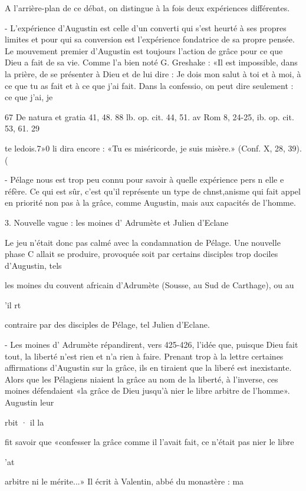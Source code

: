 A l'arrière-plan de ce débat, on distingue à la fois deux  expériences différentes.

-	L'expérience d'Augustin est celle d'un converti qui s'est heurté à ses propres limites et pour qui sa conversion est l'expérience fondatrice de sa propre pensée. Le mouvement premier d'Augustin est toujours l'action de grâce pour ce que Dieu a fait de sa vie. Comme l'a bien noté G. Greshake : «Il est impossible, dans la prière, de se présenter à Dieu et de lui dire : Je dois mon salut à toi et à moi, à ce que tu as fait et à ce que j'ai fait. Dans la confessio, on peut dire seulement : ce que j'ai, je



67  De natura et gratia 41, 48.
88 lb. op. cit. 44, 51.
av Rom 8, 24-25, ib. op. cit. 53, 61.
29
 
te ledois.7»0	li dira encore : «Tu es miséricorde, je suis misère.» (Conf. X, 28, 39).	(

-  Pélage nous est  trop peu  connu pour savoir à quelle expérience pers n elle    e réfère. Ce qui est sûr, c'est qu'il représente un type de chnst,anisme qui fait appel en priorité non pas à la grâce, comme Augustin, mais aux capacités de l'homme.

3.	Nouvelle vague : les moines d' Adrumète et Julien d'Eclane

Le jeu n'était donc pas calmé avec la condamnation de Pélage. Une nouvelle phase	C
allait se produire,	provoquée soit par certains disciples trop dociles d'Augustin, tels
 
les	moines du couvent africain d'Adrumète (Sousse, au Sud de Carthage), ou au
 
'il rt
 
contraire par des disciples de Pélage, tel Julien d'Eclane.

- Les moines d' Adrumète répandirent, vers 425-426, l'idée que, puisque Dieu fait tout, la liberté n'est rien et n'a rien à faire. Prenant trop à la lettre certaines affirmations d'Augustin sur la grâce, ils en tiraient que la liberé est inexistante. Alors que les Pélagiens niaient la grâce au nom de la liberté, à l'inverse, ces moines défendaient «la grâce de Dieu jusqu'à nier le libre arbitre de l'homme». Augustin leur
 

rbit
· il
la
 
fit savoir que «confesser la grâce comme il l'avait fait, ce n'était pas nier le libre
 
'at
 
arbitre ni le mérite...» Il écrit  à  Valentin, abbé du monastère :	ma
 
